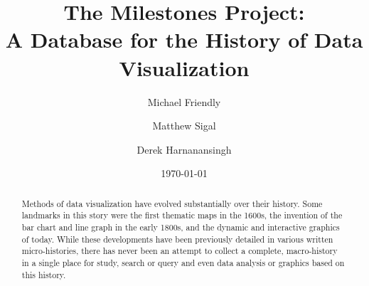 \documentclass[11pt]{article}
\newcommand{\TODO}[1]{\begin{quotation}\noindent\color{blue}\textbf{ToDo}: #1\end{quotation}}
\begin{document}
\title{The Milestones Project: \\ A Database for the History of Data Visualization}
\author{Michael Friendly \and Matthew Sigal \and Derek Harnanansingh}
\date{\today}

\maketitle

\begin{abstract}
\begin{comment}
Re-reading the abstract, I think it could be rephrased slightly to update the language with more modern historical scholarship (most of the changes are in paragraph 1).  Here is what I propose:

Methods of data visualization have evolved substantially over their relatively brief history.
Landmarks in this story were the first thematic maps in the 1600s, the invention of the bar chart and the line graph in the early 1800s,
and the dynamic and interactive graphics of today.  While these developments have been previously detailed in various micro-histories,
they were aimed at a privileged and academic audience, and a publicly accessible and free space to house a macro-history in its totality did not exist.

The purpose of this chapter is threefold:
first, to introduce the reader our solution to this absence through an online resource called the Milestones Project.
This website highlights important events in the history of data visualization, and enables users to interactively travel through time to see and explore the
context that surrounded their developments.
Secondly, we present some striking visual examples that deal with conveying aspects of history over time, drawn from this resource.
Finally, the Milestones database itself will be used to showcase how such a resource can serve as ``data'' for \emph{statistical historiography},
which entails the use of statistical and graphical methods for the analysis and understanding of historical innovations, developments, and trends.
\end{comment}

Methods of data visualization have evolved substantially over their history.
Some landmarks in this story were the first thematic maps in the 1600s, the invention of the bar chart and line graph in the early 1800s,
and the dynamic and interactive graphics of today.  
While these developments have been previously detailed in various written micro-histories, 
there has never been an attempt to collect a complete, macro-history in a single place for study, search or query and even data analysis or graphics based on this history.


\end{abstract}
\end{document}
